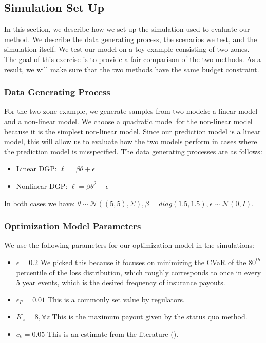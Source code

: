 \documentclass[11pt]{article}
\begin{document}
  \subsection{Simulation Set Up}
   In this section, we describe how we set up the simulation used to evaluate our method. We describe the data generating process, the scenarios we test, and the simulation itself. We test our model on a toy example consisting of two zones. The goal of this exercise is to provide a fair comparison of the two methods. As a result, we will make sure that the two methods have the same budget constraint.
    \subsubsection{Data Generating Process}
    For the two zone example, we generate samples from two models: a linear model and a non-linear model. We choose a quadratic model for the non-linear model because it is the simplest non-linear model. Since our prediction model is a linear model, this will allow us to evaluate how the two models perform in cases where the prediction model is misspecified. The data generating processes are as follows: 
      \begin{itemize}
        \item Linear DGP: $\ell = \beta \theta + \epsilon$
        \item Nonlinear DGP: $\ell = \beta \theta^2 + \epsilon$
      \end{itemize}

    In both cases we have: $\theta \sim \mathcal{N}((5,5),\Sigma), \beta = diag(1.5,1.5), \epsilon \sim \mathcal{N}(0,I)$. 

    \subsubsection{Optimization Model Parameters}
      We use the following parameters for our optimization model in the simulations:

      \begin{itemize}
        \item $\epsilon=0.2$ We picked this because it focuses on minimizing the CVaR of the $80^{th}$ percentile of the loss distribution, which roughly corresponds to once in every 5 year events, which is the desired frequency of insurance payouts.  
        \item $\epsilon_P=0.01$ This is a commonly set value by regulators.
        \item $K_z = 8, \forall z$ This is the maximum payout given by the status quo method.  
        \item $c_k=0.05$ This is an estimate from the literature (\cite{damodaran2016cost}). 
    \end{itemize}
\end{document}
